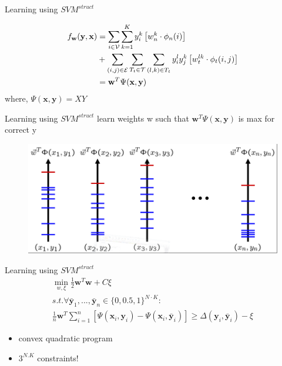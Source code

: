 \documentclass{beamer}
\newcommand{\n}{{n}}             %
\newcommand{\x}{{\mathbf x}}     %
\newcommand{\y}{{\mathbf y}}     %
\newcommand{\ysc}[2]{{y_{#1}^{#2}}}    %
\newcommand{\fn}[1]{{\phi_n(#1)}}      %
\newcommand{\fe}[3]{{\phi_{#1}(#2,#3)}}%
\newcommand{\w}{{\mathbf w}}           %
\newcommand{\wn}[1]{{w_n^{#1}}}        %
\newcommand{\we}[3]{{w_{#1}^{#2#3}}}   %
\newcommand{\df}[3]{{f_{#3}(#1,#2)}}   %
\begin{document}
\begin{frame}{Learning using $SVM^{struct}$}

\begin{equation} \label{eq:model}
\begin{split}
\df{\y}{\x}{\w} & = \sum_{i \in \mathcal{V}} \sum_{k=1}^{K} \ysc{i}{k} \left[\wn{k} \cdot \fn{i} \right] \\
 & + \sum_{(i,j)\in \mathcal{E}}   \sum_{T_t \in {\cal T}}  \sum_{(l,k)\in T_t} \ysc{i}{l} \ysc{j}{k}  \left[\we{t}{l}{k} \cdot \fe{t}{i}{j}\right] \\
& = \w^T \Psi(\x,\y)
 \end{split}
\end{equation}
where, $\Psi(\x,\y)=XY$

\end{frame}

\begin{frame}{Learning using $SVM^{struct}$}
learn weights w such that $\w^T \Psi(\x,\y)$  is max for correct y
\begin{figure}[t!]
\includegraphics[width=.9\linewidth]{struct.png}
\end{figure}
\end{frame}


\begin{frame}{Learning using $SVM^{struct}$}
\begin{eqnarray} \label{eq:trainqp}
\min_{w,\xi}    \frac{1}{2} \w^T\w + C\xi\\
s.t.   \forall \bar{\y}_1,...,\bar{\y}_\n \in \{0,0.5,1\}^{N \cdot K} :\\
 \frac{1}{n} \w^T \sum_{i=1}^{n} [\Psi( \x_i, \y_i) \nonumber - \Psi(\x_i,\bar{\y}_i)] \ge \Delta(\y_i,\bar{\y}_i) -\xi \nonumber
\end{eqnarray}

\begin{itemize}
\item convex quadratic program
\item $3^{N.K}$ constraints!
\end{itemize}
\end{frame}
\end{document}
